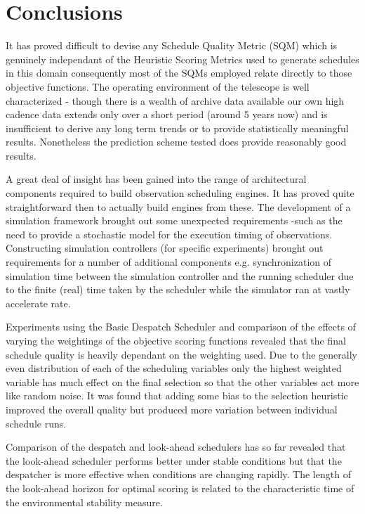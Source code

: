 \documentclass[12pt,a4paper]{article}
\begin{document}
{%
\newpage
\section{Conclusions}
It has proved difficult to devise any Schedule Quality Metric (SQM) which is genuinely independant of the Heuristic Scoring Metrics used to generate schedules in this domain consequently most of the SQMs employed relate directly to those objective functions. The operating environment of the telescope is well characterized - though there is a wealth of archive data available our own high cadence data extends only over a short period (around 5 years now) and is insufficient to derive any long term trends or to provide statistically meaningful results. Nonetheless the prediction scheme tested does provide reasonably good results. 

A great deal of insight has been gained into the range of architectural components required to build observation scheduling engines. It has proved quite straightforward then to actually build engines from these. The development of a simulation framework brought out some unexpected requirements -such as the need to provide a stochastic model for the execution timing of observations. Constructing simulation controllers (for specific experiments) brought out requirements for a number of additional components e.g. synchronization of simulation time between the simulation controller and the running scheduler due to the finite (real) time taken by the scheduler while the simulator ran at vastly accelerate rate. 

Experiments using the Basic Despatch Scheduler and comparison of the effects of varying the weightings of the objective scoring functions revealed that the final schedule quality is heavily dependant on the weighting used. Due to the generally even distribution of each of the scheduling variables only the highest weighted variable has much effect on the final selection so that the other variables act more like random noise. It was found that adding some bias to the selection heuristic improved the overall quality but produced more variation between individual schedule runs. 

Comparison of the despatch and look-ahead schedulers has so far revealed that the look-ahead scheduler performs better under stable conditions but that the despatcher is more effective when conditions are changing rapidly. The length of the look-ahead horizon for optimal scoring is related to the characteristic time of the environmental stability measure.


}
\end{document}
